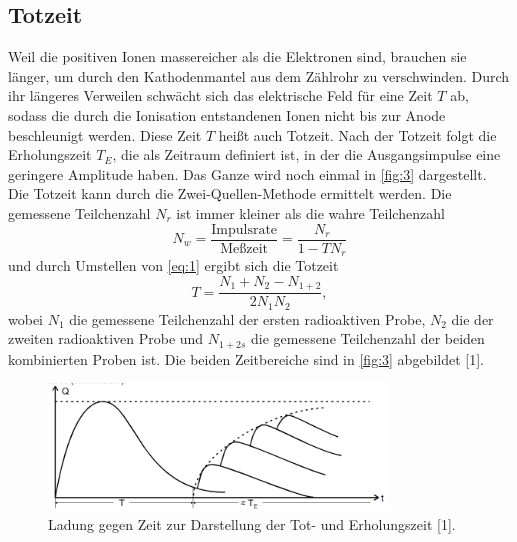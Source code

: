 \subsection{Totzeit}
Weil die positiven Ionen massereicher als die Elektronen sind, brauchen sie länger, um durch den Kathodenmantel aus dem Zählrohr zu verschwinden. Durch ihr längeres Verweilen schwächt sich das elektrische Feld für eine Zeit $T$ ab, sodass die durch die Ionisation entstandenen Ionen nicht bis zur Anode beschleunigt werden. Diese Zeit $T$ heißt auch Totzeit. Nach der Totzeit folgt die Erholungszeit $T_E$, die als Zeitraum definiert ist, in der die Ausgangsimpulse eine geringere Amplitude haben. Das Ganze wird noch einmal in \autoref{fig:3} dargestellt.\\
Die Totzeit kann durch die Zwei-Quellen-Methode ermittelt werden. Die gemessene Teilchenzahl $N_r$ ist immer kleiner als die wahre Teilchenzahl
\begin{equation}
  N_w=\frac{\textrm{Impulsrate}}{\textrm{Meßzeit}}=\frac{N_r}{1-TN_r}
  \label{eq:1}
\end{equation}
und durch Umstellen von \eqref{eq:1} ergibt sich die Totzeit
\begin{equation}
  T=\frac{N_1+N_2-N_{1+2}}{2N_{1}N_{2}},
  \label{eq:2}
\end{equation}
wobei $N_1$ die gemessene Teilchenzahl der ersten radioaktiven Probe, $N_2$ die der zweiten radioaktiven Probe und $N_{1+2s}$ die gemessene Teilchenzahl der beiden kombinierten Proben ist.
Die beiden Zeitbereiche sind in \autoref{fig:3} abgebildet [1].
\begin{figure}[H] 
  \centering 
  \includegraphics[width=9cm]{content/3.png} 
  \caption{Ladung gegen Zeit zur Darstellung der Tot- und Erholungszeit [1].} 
  \label{fig:3} 
\end{figure}



